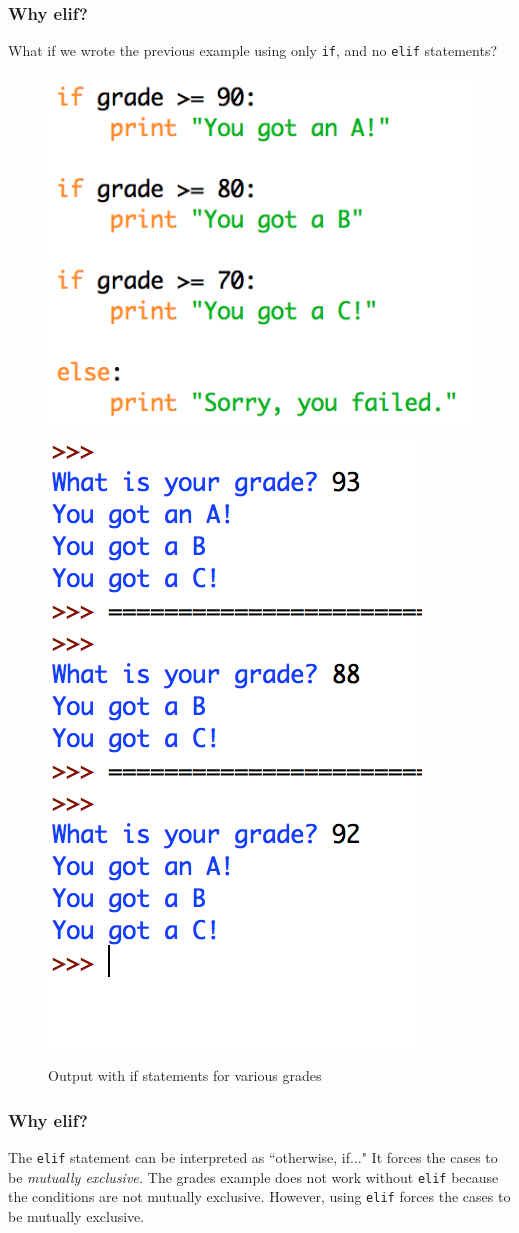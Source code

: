 \documentclass{beamer}
\begin{document}
\begin{frame}[fragile]
\frametitle{Why elif?}

What if we wrote the previous example using only \verb|if|, and no \verb|elif| statements?

\begin{figure}[h]
\includegraphics[width=.48\linewidth]{IMG/boo.png}
\includegraphics[width=.3\linewidth]{IMG/output.png}
\caption{Output with if statements for various grades}
\end{figure}
\end{frame}


\begin{frame}[fragile]
\frametitle{Why elif?}

The \verb|elif| statement can be interpreted as ``otherwise, if..." It forces the cases to be \emph{mutually exclusive.} The grades example does not work without \verb|elif| because the conditions are not mutually exclusive. However, using \verb|elif| forces the cases to be mutually exclusive. 
\end{frame}
\end{document}
